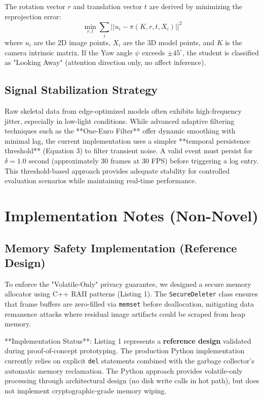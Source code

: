 \documentclass[conference]{IEEEtran}
\begin{document}
The rotation vector $r$ and translation vector $t$ are derived by minimizing the reprojection error:
\begin{equation}
\min_{r, t} \sum_{i} || u_i - \pi(K, r, t, X_i) ||^2
\end{equation}
where $u_i$ are the 2D image points, $X_i$ are the 3D model points, and $K$ is the camera intrinsic matrix. If the Yaw angle $\psi$ exceeds $\pm 45^{\circ}$, the student is classified as "Looking Away" (attention direction only, no affect inference).

\subsection{Signal Stabilization Strategy}
Raw skeletal data from edge-optimized models often exhibits high-frequency jitter, especially in low-light conditions. While advanced adaptive filtering techniques such as the **One-Euro Filter** \cite{b8} offer dynamic smoothing with minimal lag, the current implementation uses a simpler **temporal persistence threshold** (Equation 3) to filter transient noise. A valid event must persist for $\delta = 1.0$ second (approximately 30 frames at 30 FPS) before triggering a log entry. This threshold-based approach provides adequate stability for controlled evaluation scenarios while maintaining real-time performance. 

\section{Implementation Notes (Non-Novel)}

\subsection{Memory Safety Implementation (Reference Design)}
To enforce the "Volatile-Only" privacy guarantee, we designed a secure memory allocator using C++ RAII patterns (Listing 1). The \texttt{SecureDeleter} class ensures that frame buffers are zero-filled via \texttt{memset} before deallocation, mitigating data remanence attacks where residual image artifacts could be scraped from heap memory.

**Implementation Status**: Listing 1 represents a \textbf{reference design} validated during proof-of-concept prototyping. The production Python implementation currently relies on explicit \texttt{del} statements combined with the garbage collector's automatic memory reclamation. The Python approach provides volatile-only processing through architectural design (no disk write calls in hot path), but does not implement cryptographic-grade memory wiping.
\end{document}
